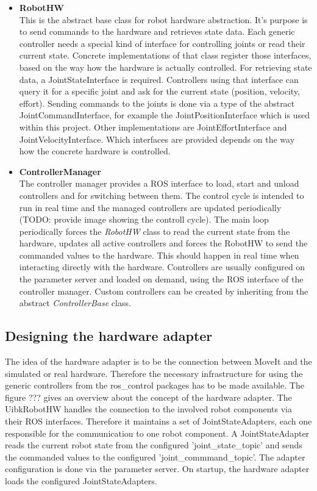 \begin{itemize}

\item \textbf{RobotHW} \\

This is the abstract base class for robot hardware abstraction. It's purpose is to send commands to the hardware and retrieves state data. Each generic controller needs a special kind of interface for controlling joints or read their current state. Concrete implementations of that class register those interfaces, based on the way how the hardware is actually controlled. For retrieving state data, a JointStateInterface is required. Controllers using that interface can query it for a specific joint and ask for the current state (position, velocity, effort). Sending commands to the joints is done via a type of the abstract JointCommandInterface, for example the JointPositionInterface which is used within this project. Other implementations are JointEffortInterface and JointVelocityInterface. Which interfaces are provided depends on the way how the concrete hardware is controlled.

\item \textbf{ControllerManager} \\

The controller manager provides a ROS interface to load, start and unload controllers and for switching between them. The control cycle is intended to run in real time
and the managed controllers are updated periodically (TODO: provide image showing the controll cycle). The main loop periodically forces the \emph{RobotHW} class to read the current state from the hardware, updates all active controllers and forces the RobotHW to send the commanded values to the hardware. This should happen in real time when interacting directly with the hardware. Controllers are usually configured on the parameter server and loaded on demand, using the ROS interface of the controller manager. Custom controllers can be created by inheriting from the abstract  \emph{ControllerBase} class.  

\end{itemize}

\subsection{Designing the hardware adapter}

The idea of the hardware adapter is to be the connection between MoveIt and the simulated or real hardware. Therefore the necessary infrastructure for using the generic controllers from the ros\_control packages has to be made available. The figure ??? gives an overview about the concept of the hardware adapter. The UibkRobotHW handles the connection to the involved robot components via their ROS interfaces. Therefore it maintains a set of JointStateAdapters, each one responsible for the communication to one robot component. A JointStateAdapter reads the current robot state from the configured 'joint\_state\_topic' and sends the commanded values to the configured 'joint\_commmand\_topic'. The adapter configuration is done via the parameter server. On startup, the hardware adapter loads the configured JointStateAdapters.

